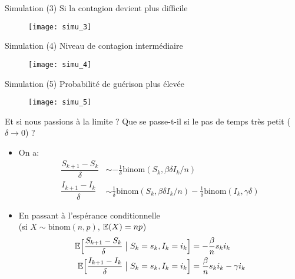 \documentclass[10pt]{beamer}
\begin{document}
\begin{frame}{Simulation (3)}
  Si la contagion devient plus difficile
  \begin{figure}
    \texttt{[image: simu\_3]}
  \end{figure}
\end{frame}

\begin{frame}{Simulation (4)}
  Niveau de contagion intermédiaire
  \begin{figure}
    \texttt{[image: simu\_4]}
  \end{figure}
\end{frame}

\begin{frame}{Simulation (5)}
  Probabilité de guérison plus élevée
  \begin{figure}
    \texttt{[image: simu\_5]}
  \end{figure}
\end{frame}

\begin{frame}{Et si nous passions à la limite ?}
  Que se passe-t-il si le pas de temps très petit ($\delta \to 0$) ?
  \begin{itemize}
    \item On a:
    \[
      \begin{aligned}
        \dfrac{S_{k+1} - S_k}{\delta} &\sim - \frac{1}{\delta} \text{binom}(S_k, \beta \delta I_k / n)
      \\
        \dfrac{I_{k+1} - I_k}{\delta} &\sim \frac{1}{\delta} \text{binom}(S_k, \beta \delta I_k / n) -
        \frac{1}{\delta} \text{binom}(I_k, \gamma \delta)
      \end{aligned}
    \]
  \item En passant à l'espérance conditionnelle \\ (si $X \sim \text{binom}(n, p)$, $\mathbb{E}(X) = n p$)
    \[
      \begin{aligned}
        \mathbb{E}\Big[\dfrac{S_{k+1} - S_k}{\delta} \; \bigr\vert \; S_k=s_k, I_k=i_k\Big] &= -\frac{\beta}{n} s_k i_k
      \\
        \mathbb{E}\Big[\dfrac{I_{k+1} - I_k}{\delta}\; \bigr\vert \; S_k=s_k, I_k=i_k\Big] &= \frac{\beta}{n} s_k i_k - \gamma i_k
      \end{aligned}
    \]
  \end{itemize}
\end{frame}
\end{document}
